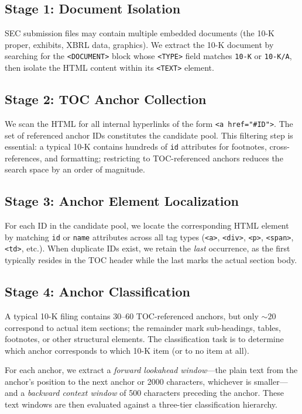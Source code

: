 \documentclass[12pt,letterpaper,oneside]{article}
\begin{document}
\subsection{Stage 1: Document Isolation}

SEC submission files may contain multiple embedded documents (the 10-K
proper, exhibits, XBRL data, graphics). We extract the 10-K document
by searching for the \texttt{<DOCUMENT>} block whose \texttt{<TYPE>}
field matches \texttt{10-K} or \texttt{10-K/A}, then isolate the HTML
content within its \texttt{<TEXT>} element.

\subsection{Stage 2: TOC Anchor Collection}

We scan the HTML for all internal hyperlinks of the form
\texttt{<a href="\#ID">}. The set of referenced anchor IDs constitutes
the candidate pool. This filtering step is essential: a typical 10-K
contains hundreds of \texttt{id} attributes for footnotes,
cross-references, and formatting; restricting to TOC-referenced anchors
reduces the search space by an order of magnitude.

\subsection{Stage 3: Anchor Element Localization}

For each ID in the candidate pool, we locate the corresponding HTML
element by matching \texttt{id} or \texttt{name} attributes across
all tag types (\texttt{<a>}, \texttt{<div>}, \texttt{<p>},
\texttt{<span>}, \texttt{<td>}, etc.). When duplicate IDs exist, we
retain the \emph{last} occurrence, as the first typically resides in
the TOC header while the last marks the actual section body.

\subsection{Stage 4: Anchor Classification}\label{sec:classify}

A typical 10-K filing contains 30--60 TOC-referenced anchors, but
only ${\sim}20$ correspond to actual item sections; the remainder
mark sub-headings, tables, footnotes, or other structural elements.
The classification task is to determine which anchor corresponds to
which 10-K item (or to no item at all).

For each anchor, we extract a \emph{forward lookahead window}---the
plain text from the anchor's position to the next anchor or 2000
characters, whichever is smaller---and a \emph{backward context
window} of 500 characters preceding the anchor. These text windows
are then evaluated against a three-tier classification hierarchy.
\end{document}
